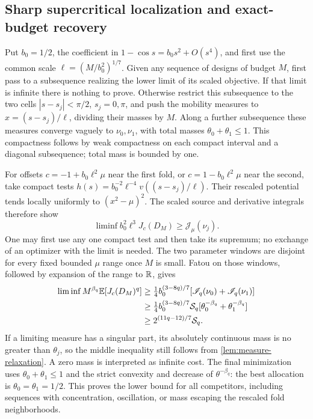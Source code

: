 \subsection{Sharp supercritical localization and exact-budget recovery}
Put $b_0=1/2$, the coefficient in
$1-\cos s=b_0s^2+O(s^4)$, and first use the common scale
$\ell=(M/b_0^2)^{1/7}$. Given any sequence of designs of budget $M$,
first pass to a subsequence realizing the lower limit of its scaled
objective. If that limit is infinite there is nothing to prove.
Otherwise restrict this subsequence to the two cells
$|s-s_j|<\pi/2$, $s_j=0,\pi$, and
push the mobility measures to $x=(s-s_j)/\ell$, dividing their
masses by $M$. Along a further subsequence these measures converge vaguely
to $\nu_0,\nu_1$, with total masses $\theta_0+\theta_1\le1$.
This compactness follows by weak compactness on each compact interval
and a diagonal subsequence; total mass is bounded by one.

For offsets $c=-1+b_0\ell^2\mu$ near the first fold, or
$c=1-b_0\ell^2\mu$ near the second, take compact tests
$h(s)=b_0^{-2}\ell^{-4}v((s-s_j)/\ell)$.
Their rescaled potential tends locally uniformly to $(x^2-\mu)^2$.
The scaled source and derivative integrals therefore show
\begin{equation}\label{eq:fold-liminf-local}
 \liminf b_0^2\ell^3J_c(D_M)\ge\mathscr J_\mu(\nu_j).
\end{equation}
One may first use any one compact test and then take its supremum;
no exchange of an optimizer with the limit is needed. The two
parameter windows are disjoint for every fixed bounded $\mu$ range
once $M$ is small. Fatou on those windows, followed by expansion of
the range to $\mathbb R$, gives
\begin{align}
 \liminf M^{\beta_q}\mathbb E[J_c(D_M)^q]
 &\ge \tfrac14 b_0^{(3-8q)/7}
       [\mathscr I_q(\nu_0)+\mathscr I_q(\nu_1)]\notag\\
 &\ge \tfrac14 b_0^{(3-8q)/7}\mathcal S_q
       [\theta_0^{-\beta_q}+\theta_1^{-\beta_q}]\notag\\
 &\ge 2^{(11q-12)/7}\mathcal S_q.
                                                   \label{eq:fold-sharp-lower}
\end{align}
If a limiting measure has a singular part, its absolutely continuous
mass is no greater than $\theta_j$, so the middle inequality still
follows from \cref{lem:measure-relaxation}. A zero mass is interpreted
as infinite cost. The final minimization uses $\theta_0+\theta_1\le1$
and the strict convexity and decrease of $\theta^{-\beta_q}$: the
best allocation is $\theta_0=\theta_1=1/2$. This proves the lower
bound for all competitors, including sequences with concentration,
oscillation, or mass escaping the rescaled fold neighborhoods.

